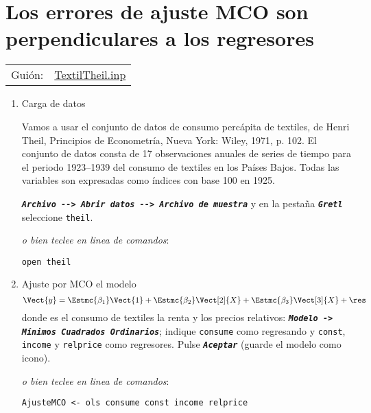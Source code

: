 \documentclass[11pt]{article}
\begin{document}
\section{Los errores de ajuste MCO son perpendiculares a los regresores}
\label{sec:org891e0ed}
\begin{center}
\begin{tabular}{ll}
Guión: & \href{https://github.com/mbujosab/Ectr/tree/master/Practicas/Gretl/scripts/TextilTheil.inp}{TextilTheil.inp}\\[0pt]
\end{tabular}
\end{center}

\begin{enumerate}
\item Carga de datos
\label{sec:org0cca9e9}

Vamos a usar el conjunto de datos de consumo percápita de textiles, de
Henri Theil, Principios de Econometría, Nueva York: Wiley, 1971,
p. 102.  El conjunto de datos consta de 17 observaciones anuales de
series de tiempo para el periodo 1923--1939 del consumo de textiles en
los Países Bajos. Todas las variables son expresadas como índices con
base 100 en 1925.

\textbf{\emph{\texttt{Archivo -{}-> Abrir datos -{}-> Archivo de muestra}}} y en la pestaña
\textbf{\emph{\texttt{Gretl}}} seleccione \texttt{theil}.

{\vspace{3pt} \color{gray!70!black}
\emph{o bien teclee en linea de comandos}:
\begin{verbatim}
open theil
\end{verbatim}
}

\item Ajuste por MCO el modelo
\label{sec:org1b863df}
\begin{displaymath}
  \Vect{y}=\Estmc{\beta_1}\Vect{1}+\Estmc{\beta_2}\Vect[2]{X}+\Estmc{\beta_3}\Vect[3]{X}+\res
\end{displaymath}
donde  es el consumo de textiles  la renta y
 los precios relativos: \textbf{\emph{\texttt{Modelo -> Mínimos Cuadrados
Ordinarios}}}; indique \texttt{consume} como regresando y \texttt{const}, \texttt{income} y
\texttt{relprice} como regresores. Pulse \textbf{\emph{\texttt{Aceptar}}} (guarde el modelo como
icono).

{\vspace{3pt} \color{gray!70!black}
\emph{o bien teclee en linea de comandos}:
\begin{verbatim}
AjusteMCO <- ols consume const income relprice
\end{verbatim}
}


\end{enumerate}
\end{document}
